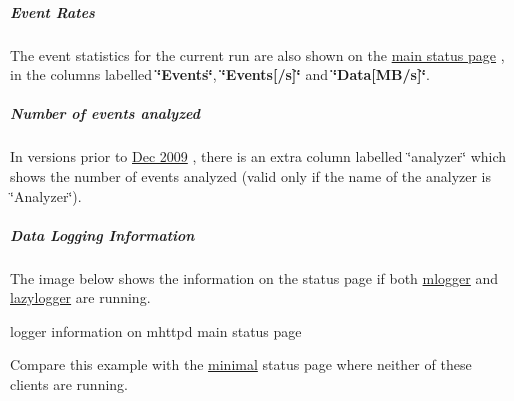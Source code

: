 \par
 \label{RC_mhttpd_status_page_features_idx_mhttpd_page_status_event-rate}
\hypertarget{RC_mhttpd_status_page_features_idx_mhttpd_page_status_event-rate}{}
 \hypertarget{RC_mhttpd_status_page_features_RC_mhttpd_status_Event_Rates}{}\subparagraph{Event Rates}\label{RC_mhttpd_status_page_features_RC_mhttpd_status_Event_Rates}
The event statistics for the current run are also shown on the \hyperlink{RC_mhttpd_status_page_features_RC_mhttpd_status_Equipment_info}{main status page} , in the columns labelled {\bfseries \char`\"{}Events\char`\"{}}, {\bfseries \char`\"{}Events\mbox{[}/s\mbox{]}\char`\"{}} and {\bfseries \char`\"{}Data\mbox{[}MB/s\mbox{]}\char`\"{}}.

\par


\par
 \hypertarget{RC_mhttpd_status_page_features_RC_mhttpd_status_analyzer}{}\subparagraph{Number of events analyzed}\label{RC_mhttpd_status_page_features_RC_mhttpd_status_analyzer}
In versions prior to \hyperlink{NDF_ndf_dec_2009}{Dec 2009} , there is an extra column labelled \char`\"{}analyzer\char`\"{} which shows the number of events analyzed (valid only if the name of the analyzer is \char`\"{}Analyzer\char`\"{}).

\par


\par
\hypertarget{RC_mhttpd_status_page_features_RC_mhttpd_status_Logger}{}\subparagraph{Data Logging Information}\label{RC_mhttpd_status_page_features_RC_mhttpd_status_Logger}
The image below shows the information on the status page if both \hyperlink{F_Logging_F_mlogger_utility}{mlogger} and \hyperlink{F_LogUtil_F_lazylogger_utility}{lazylogger} are running.

\begin{center} logger information on mhttpd main status page \par
\par
\par
  \end{center}  \par


Compare this example with the \hyperlink{RC_mhttpd_utility_RC_mhttpd_minimal_status_page}{minimal} status page where neither of these clients are running.

